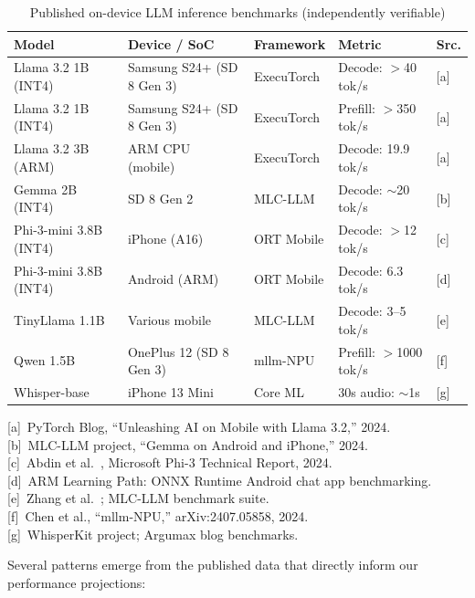 \documentclass[12pt, letterpaper, twoside]{report}
\begin{document}
\begin{table}[H]
\centering
\caption{Published on-device LLM inference benchmarks (independently verifiable)}
\label{tab:published_benchmarks}
{\small
\begin{tabular}{@{}p{3.0cm}p{3.0cm}p{2.0cm}p{3.2cm}l@{}}
\toprule
\textbf{Model} & \textbf{Device / SoC} & \textbf{Framework} & \textbf{Metric} & \textbf{Src.} \\
\midrule
Llama 3.2 1B (INT4) & Samsung S24+ (SD 8 Gen 3) & ExecuTorch & Decode: {$>$40 tok/s} & [a] \\[2pt]
Llama 3.2 1B (INT4) & Samsung S24+ (SD 8 Gen 3) & ExecuTorch & Prefill: {$>$350 tok/s} & [a] \\[2pt]
Llama 3.2 3B (ARM) & ARM CPU (mobile) & ExecuTorch & Decode: 19.9 tok/s & [a] \\[2pt]
Gemma 2B (INT4) & SD 8 Gen 2 & MLC-LLM & Decode: ${\sim}$20 tok/s & [b] \\[2pt]
Phi-3-mini 3.8B (INT4) & iPhone (A16) & ORT Mobile & Decode: {$>$12 tok/s} & [c] \\[2pt]
Phi-3-mini 3.8B (INT4) & Android (ARM) & ORT Mobile & Decode: 6.3 tok/s & [d] \\[2pt]
TinyLlama 1.1B & Various mobile & MLC-LLM & Decode: 3--5 tok/s & [e] \\[2pt]
Qwen 1.5B & OnePlus 12 (SD 8 Gen 3) & mllm-NPU & Prefill: {$>$1000 tok/s} & [f] \\[2pt]
Whisper-base & iPhone 13 Mini & Core ML & 30s audio: ${\sim}$1s & [g] \\
\bottomrule
\end{tabular}
}
\vspace{4pt}

{\scriptsize\noindent
{[a]}~PyTorch Blog, ``Unleashing AI on Mobile with Llama 3.2,'' 2024.\\
{[b]}~MLC-LLM project, ``Gemma on Android and iPhone,'' 2024.\\
{[c]}~Abdin et al.~\citep{abdin2024phi3}, Microsoft Phi-3 Technical Report, 2024.\\
{[d]}~ARM Learning Path: ONNX Runtime Android chat app benchmarking.\\
{[e]}~Zhang et al.~\citep{zhang2024tinyllama}; MLC-LLM benchmark suite.\\
{[f]}~Chen et al., ``mllm-NPU,'' arXiv:2407.05858, 2024.\\
{[g]}~WhisperKit project; Argumax blog benchmarks.
}
\end{table}

Several patterns emerge from the published data that directly inform our performance projections:
\end{document}
